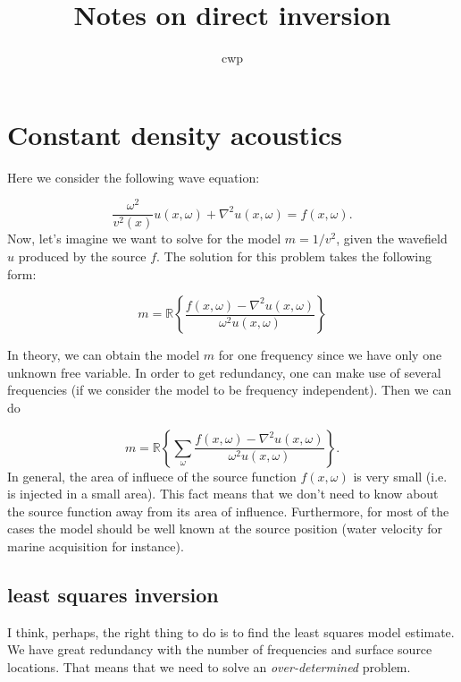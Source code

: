 \documentclass[10pt]{article}
\author{cwp}
\title{Notes on direct inversion}{}
\begin{document}
\maketitle


\section{Constant density acoustics}

Here we consider the following wave equation:

\begin{equation}
  \frac{\omega^2 }{v^2(x)} u(x,\omega) +\nabla^2 u(x,\omega) = f(x,\omega).
  \label{eq:cden}
\end{equation}
 Now, let's imagine we want to solve for the model $m = 1/v^2$, given the wavefield $u$ produced
by the source $f$. The solution for this problem takes the following form:

\begin{equation}
   m = \mathbb{R}\left\{ \frac {{f(x,\omega)} - \nabla^2{ u(x,\omega) }}{\omega^2 u(x,\omega)} \right\}
\end{equation}

In theory, we can obtain the model $m$ for one frequency since we have only one unknown free variable.
In order to get redundancy, one can make use of several frequencies (if we consider the model
to be frequency independent). Then we can do

\begin{equation}
   m =  \mathbb{R}\left\{\sum_\omega \frac {{f(x,\omega)} - \nabla^2{ u(x,\omega) }}{\omega^2 u(x,\omega)} \right\}.
\end{equation}
In general, the area of influece of the source function $f(x,\omega)$ is very small (i.e. is injected in a small area). 
 This fact means that we don't need to know about the source function away from its area of influence. Furthermore,
 for most of the cases the model  should be well known at the source position (water velocity for marine acquisition for instance). 

\subsection{least squares inversion}

I think, perhaps, the right thing to do is to find the least squares 
model estimate. We have great redundancy with the number of frequencies
and surface source locations. That means that we need to solve an 
\emph{over-determined}  problem.
\end{document}
